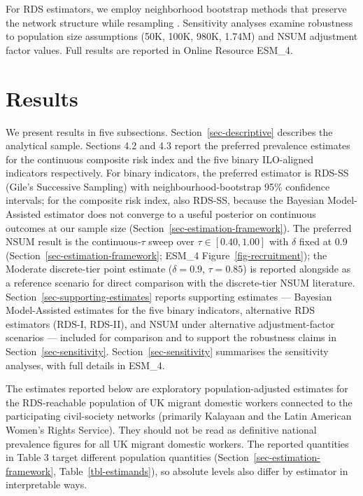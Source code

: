 \documentclass[
  12pt,
  letterpaper,
  DIV=11,
  numbers=noendperiod]{scrartcl}
\begin{document}
For RDS estimators, we employ neighborhood bootstrap methods that
preserve the network structure while resampling
\autocite{yauc22-neighborhood}. Sensitivity analyses examine robustness
to population size assumptions (50K, 100K, 980K, 1.74M) and NSUM
adjustment factor values. Full results are reported in Online Resource
ESM\_4.

\section{Results}\label{sec-results}

We present results in five subsections. Section~\ref{sec-descriptive}
describes the analytical sample. Sections 4.2 and 4.3 report the
preferred prevalence estimates for the continuous composite risk index
and the five binary ILO-aligned indicators respectively. For binary
indicators, the preferred estimator is RDS-SS (Gile's Successive
Sampling) with neighbourhood-bootstrap 95\% confidence intervals; for
the composite risk index, also RDS-SS, because the Bayesian
Model-Assisted estimator does not converge to a useful posterior on
continuous outcomes at our sample size
(Section~\ref{sec-estimation-framework}). The preferred NSUM result is
the continuous-\(\tau\) sweep over \(\tau \in [0.40, 1.00]\) with
\(\delta\) fixed at 0.9 (Section~\ref{sec-estimation-framework}; ESM\_4
Figure~\ref{fig-recruitment}); the Moderate discrete-tier point estimate
(\(\delta = 0.9\), \(\tau = 0.85\)) is reported alongside as a reference
scenario for direct comparison with the discrete-tier NSUM literature.
Section~\ref{sec-supporting-estimates} reports supporting estimates ---
Bayesian Model-Assisted estimates for the five binary indicators,
alternative RDS estimators (RDS-I, RDS-II), and NSUM under alternative
adjustment-factor scenarios --- included for comparison and to support
the robustness claims in Section~\ref{sec-sensitivity}.
Section~\ref{sec-sensitivity} summarises the sensitivity analyses, with
full details in ESM\_4.

The estimates reported below are exploratory population-adjusted
estimates for the RDS-reachable population of UK migrant domestic
workers connected to the participating civil-society networks (primarily
Kalayaan and the Latin American Women's Rights Service). They should not
be read as definitive national prevalence figures for all UK migrant
domestic workers. The reported quantities in Table 3 target different
population quantities (Section~\ref{sec-estimation-framework},
Table~\ref{tbl-estimands}), so absolute levels also differ by estimator
in interpretable ways.
\end{document}
